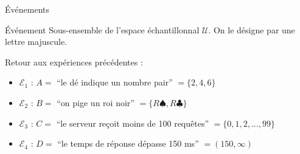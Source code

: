 \documentclass{BeamerTemplate}
\begin{document}
\begin{frame}{Événements}
\begin{Boite}{Événement}
    Sous-ensemble de l'espace échantillonnal $\mathcal{U}$. On le désigne par une lettre majuscule.
\end{Boite}
Retour aux expériences précédentes :
\begin{itemize}
    \item $\mathcal{E}_1$ : $A=$ \enquote{le dé indique un nombre pair} $=\{2,4,6\}$
    \item $\mathcal{E}_2$ : $B=$ \enquote{on pige un roi noir} $=\{R\spadesuit,R\clubsuit\}$
    \item $\mathcal{E}_3$ : $C=$ \enquote{le serveur reçoit moins de 100 requêtes} $=\{0,1,2,\ldots,99\}$
    \item $\mathcal{E}_4$ : $D=$ \enquote{le temps de réponse dépasse 150 ms} $=(150,\infty)$
\end{itemize}

\end{frame}
\end{document}
